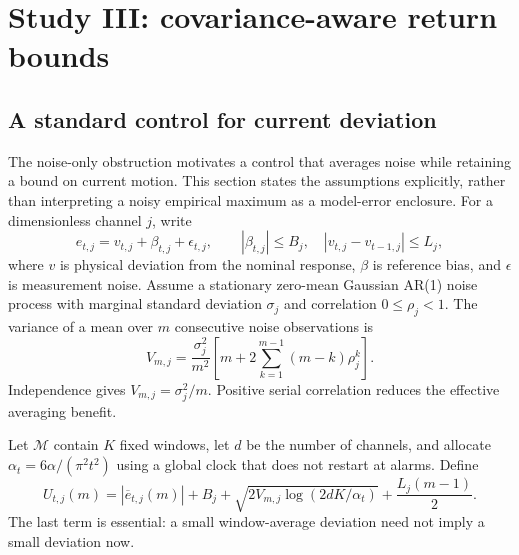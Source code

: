 \section{Study III: covariance-aware return bounds}\label{sec:window}
\subsection{A standard control for current deviation}
The noise-only obstruction motivates a control that averages noise while retaining a bound on current motion. This section states the assumptions explicitly, rather than interpreting a noisy empirical maximum as a model-error enclosure. For a dimensionless channel $j$, write
\begin{equation}
 e_{t,j}=v_{t,j}+\beta_{t,j}+\epsilon_{t,j},
 \qquad |\beta_{t,j}|\le B_j,\quad |v_{t,j}-v_{t-1,j}|\le L_j,
 \label{eq:decomposition}
\end{equation}
where $v$ is physical deviation from the nominal response, $\beta$ is reference bias, and $\epsilon$ is measurement noise. Assume a stationary zero-mean Gaussian AR(1) noise process with marginal standard deviation $\sigma_j$ and correlation $0\le\rho_j<1$. The variance of a mean over $m$ consecutive noise observations is
\begin{equation}
 V_{m,j}=\frac{\sigma_j^2}{m^2}
 \left[m+2\sum_{k=1}^{m-1}(m-k)\rho_j^k\right].
 \label{eq:covariance}
\end{equation}
Independence gives $V_{m,j}=\sigma_j^2/m$. Positive serial correlation reduces the effective averaging benefit.

Let $\mathcal M$ contain $K$ fixed windows, let $d$ be the number of channels, and allocate $\alpha_t=6\alpha/(\pi^2t^2)$ using a global clock that does not restart at alarms. Define
\begin{equation}
 U_{t,j}(m)=|\overline e_{t,j}(m)|+B_j
 +\sqrt{2V_{m,j}\log(2dK/\alpha_t)}
 +\frac{L_j(m-1)}{2}.
 \label{eq:windowbound}
\end{equation}
The last term is essential: a small window-average deviation need not imply a small deviation now.


